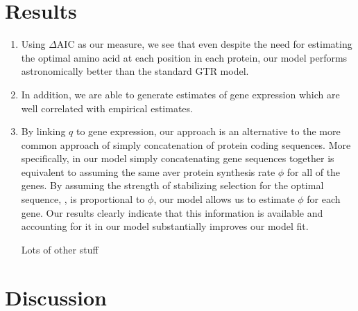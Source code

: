 \documentclass{article}
\newcommand{\DeltaAIC}{\ensuremath{\Delta\text{AIC}}\xspace}
\begin{document}
\section*{Results}
\begin{enumerate}
\item Using \DeltaAIC as our measure, we see that even despite the need for estimating the optimal amino acid at each position in each protein, our model performs astronomically better than the standard GTR model.
\item In addition, we are able to generate estimates of gene expression which are well correlated with empirical estimates.
\item By linking $q$ to gene expression, our approach is an alternative to the more common approach of simply concatenation of protein coding sequences.
More specifically, in our model simply concatenating gene sequences together is equivalent to assuming the same aver protein synthesis rate $\phi$ for all of the genes.
By assuming the strength of stabilizing selection for the optimal sequence, \astarvec, is proportional to $\phi$, our model allows us to estimate $\phi$ for each gene.
Our results clearly indicate that this information is available and accounting for it in our model substantially improves our model fit.

\item [Lots of other stuff]
\end{enumerate}
\section*{Discussion}
\end{document}
